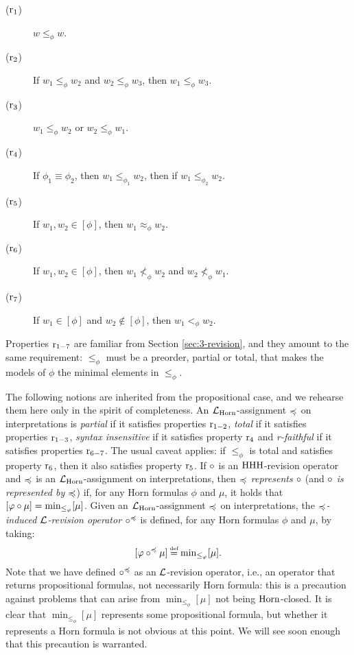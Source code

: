 \begin{description}
	\item[($\mathrm{r}_{1}$)] $w\le_\phi w$.
	\item[($\mathrm{r}_{2}$)] If $w_1\le_\phi w_2$ and $w_2\le_\phi w_3$, then $w_1\le_\phi w_3$.
	\item[($\mathrm{r}_{3}$)] $w_1\le_\phi w_2$ or $w_2\le_\phi w_1$.
	\item[($\mathrm{r}_{4}$)] If $\phi_{1}\equiv \phi_{2}$,
		then $w_1\le_{\phi_{1}} w_2$, then if $w_1\le_{\phi_{2}}w_2$.	
	\item[($\mathrm{r}_{5}$)] If $w_1,w_2\in[\phi]$, then $w_1\approx_\phi w_2$.
	\item[($\mathrm{r}_{6}$)] If $w_1,w_2\in[\phi]$, then $w_1\not<_\phi w_2$ and $w_2\not<_\phi w_1$.
	\item[($\mathrm{r}_{7}$)] If $w_1\in [\phi]$ and $w_2\notin [\phi]$, then $w_1 <_\phi w_2$.
\end{description}

Properties $\mathrm{r}_{1-7}$ are familiar from Section \ref{sec:3-revision},
and they amount to the same requirement: $\le_{\phi}$ must be a preorder,
partial or total, that makes the models of $\phi$ the minimal elements in $\le_{\phi}$.

The following notions are inherited from the propositional case,
and we rehearse them here only in the spirit of completeness.
An $\mathcal{L}_{\mathrm{Horn}}$-assignment $\preccurlyeq$ on interpretations
is \emph{partial} if it satisfies properties $\mathrm{r}_{1-2}$,
\emph{total} if it satisfies properties $\mathrm{r}_{1-3}$,
\emph{syntax insensitive} if it satisfies property $\mathrm{r}_{4}$
and \emph{r-faithful} if it satisfies properties $\mathrm{r}_{6-7}$.
The usual caveat applies: if $\le_{\phi}$ is total and satisfies 
property $\mathrm{r}_{6}$, then it also satisfies property $\mathrm{r}_{5}$.
If $\circ$ is an ${\mathrm{HHH}}$-revision operator and 
$\preccurlyeq$ is an $\mathcal{L}_{\mathrm{Horn}}$-assignment on interpretations,
then \emph{$\preccurlyeq$ represents $\circ$}
(and \emph{$\circ$ is represented by $\preccurlyeq$})
if, for any Horn formulas $\phi$ and $\mu$,
it holds that $[\varphi\circ\mu] = {\operatorname{min}}_{\le_\varphi}[\mu]$. 
Given an $\mathcal{L}_{\mathrm{Horn}}$-assignment $\preccurlyeq$ on interpretations, 
the \emph{$\preccurlyeq$-induced $\mathcal{L}$-revision operator $\circ^\preccurlyeq$} is defined,
for any Horn formulas $\phi$ and $\mu$, 
by taking:
$$
	[\phi\re^\as\mu]\defeq\min_{\le_\phi}[\mu].
$$
Note that we have defined $\circ^{\preccurlyeq}$ as an $\mathcal{L}$-revision operator,
i.e., an operator that returns propositional formulas,
not necessarily Horn formula:
this is a precaution against problems that can arise from 
$\min_{\le_\phi}[\mu]$ not being $\mathrm{Horn}$-closed.
It is clear that $\min_{\le_\phi}[\mu]$ represents some 
propositional formula, but whether it represents a Horn formula 
is not obvious at this point. 
We will see soon enough that this precaution is warranted.

